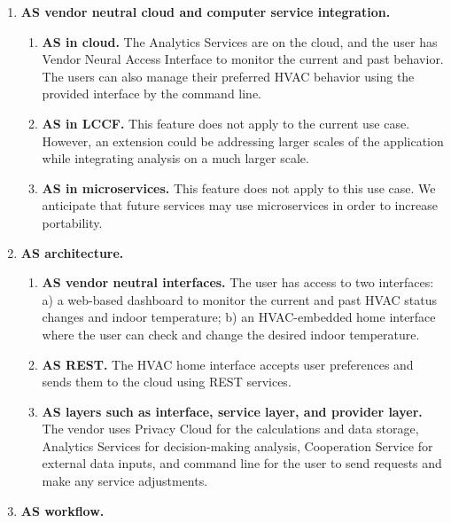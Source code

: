 \begin{enumerate}

\item{\bf AS vendor neutral cloud and computer service integration.} 

\begin{enumerate}
  \item {\bf AS in cloud.} The Analytics Services are on the cloud, and the user has Vendor Neural Access Interface to monitor the current and past behavior. The users can also manage their preferred HVAC behavior using the provided interface by the command line.
  \item {\bf AS in LCCF.} This feature does not apply to the current use case. However, an extension could be addressing larger scales of the application while integrating analysis on a much larger scale.
  \item {\bf AS in microservices.} This feature does not apply to this use case. We anticipate that future services may use microservices in order to increase portability.
\end{enumerate}

\item{\bf AS architecture.} 

\begin{enumerate}
  \item{\bf AS vendor neutral interfaces.} The user has access to two interfaces: a) a web-based dashboard to monitor the current and past HVAC status changes and indoor temperature; b) an HVAC-embedded home interface where the user can check and change the desired indoor temperature.
  \item{\bf AS REST.} The HVAC home interface accepts user preferences and sends them to the cloud using REST services. 
  \item{\bf AS layers such as interface, service layer, and provider layer.} The vendor uses Privacy Cloud for the calculations and data storage, Analytics Services for decision-making analysis, Cooperation Service for external data inputs, and command line for the user to send requests and make any service adjustments.
\end{enumerate}

\item{\bf AS workflow.} 


\end{enumerate}
